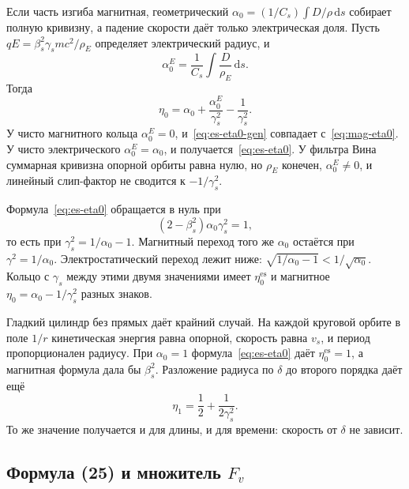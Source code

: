 Если часть изгиба магнитная, геометрический $\alpha_0=(1/C_s)\int D/\rho\,\mathrm{d}s$ собирает полную кривизну, а падение скорости даёт только электрическая доля. Пусть $qE=\beta_s^2\gamma_s mc^2/\rho_E$ определяет электрический радиус, и
\begin{equation}
\label{eq:es-alphaE}
\alpha_0^{E}
=\frac{1}{C_s}\int\frac{D}{\rho_E}\,\mathrm{d}s.
\end{equation}
Тогда
\begin{equation}
\label{eq:es-eta0-gen}
\eta_0
=\alpha_0+\frac{\alpha_0^{E}}{\gamma_s^2}-\frac{1}{\gamma_s^2}.
\end{equation}
У чисто магнитного кольца $\alpha_0^{E}=0$, и~\eqref{eq:es-eta0-gen} совпадает с~\eqref{eq:mag-eta0}. У чисто электрического $\alpha_0^{E}=\alpha_0$, и получается~\eqref{eq:es-eta0}. У фильтра Вина суммарная кривизна опорной орбиты равна нулю, но $\rho_E$ конечен, $\alpha_0^{E}\neq 0$, и линейный слип-фактор не сводится к $-1/\gamma_s^2$.

Формула~\eqref{eq:es-eta0} обращается в нуль при
\begin{equation}
\label{eq:es-transition}
(2-\beta_s^2)\alpha_0\gamma_s^2=1,
\end{equation}
то есть при $\gamma_s^2=1/\alpha_0-1$. Магнитный переход того же $\alpha_0$ остаётся при $\gamma^2=1/\alpha_0$. Электростатический переход лежит ниже: $\sqrt{1/\alpha_0-1}<1/\sqrt{\alpha_0}$. Кольцо с $\gamma_s$ между этими двумя значениями имеет $\eta_0^{\mathrm{es}}$ и магнитное $\eta_0=\alpha_0-1/\gamma_s^2$ разных знаков.

Гладкий цилиндр без прямых даёт крайний случай. На каждой круговой орбите в поле $1/r$ кинетическая энергия равна опорной, скорость равна $v_s$, и период пропорционален радиусу. При $\alpha_0=1$ формула~\eqref{eq:es-eta0} даёт $\eta_0^{\mathrm{es}}=1$, а магнитная формула дала бы $\beta_s^2$. Разложение радиуса по $\delta$ до второго порядка даёт ещё
\begin{equation}
\label{eq:es-smooth-eta1}
\eta_1=\frac{1}{2}+\frac{1}{2\gamma_s^2}.
\end{equation}
То же значение получается и для длины, и для времени: скорость от $\delta$ не зависит.

\subsection{Формула (25) и множитель $F_v$}
\label{sec:es-fv}

